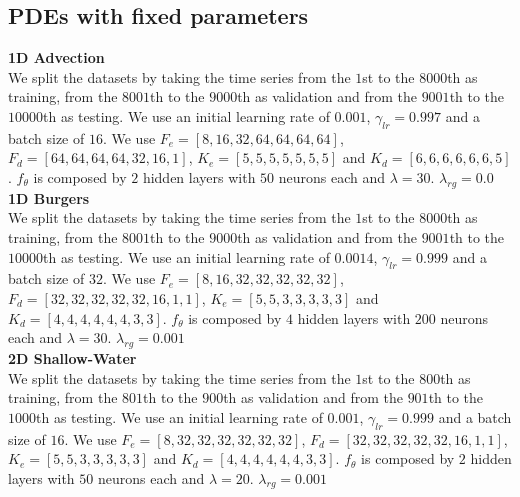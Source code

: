 \subsection{PDEs with fixed parameters}
\textbf{1D Advection}\\
We split the datasets  by taking the time series from the $1$st to the $8000$th as training, from the $8001$th to the $9000$th as validation and from the $9001$th to the $10000$th as testing. We use an initial learning rate of $0.001$, $\gamma_{lr} = 0.997$ and a batch size of $16$. We use $F_e =[8,16,32,64,64,64,64]$, $F_d =[64,64,64,64,32,16,1]$, $K_e = [5,5,5,5,5,5,5]$ and  $K_d = [6,6,6,6,6,6,5]$. $f_\theta$ is composed by $2$ hidden layers with $50$ neurons each and $\lambda=30$. $\lambda_{rg} = 0.0$\\
\textbf{1D Burgers}\\
We split the datasets  by taking the time series from the $1$st to the $8000$th as training, from the $8001$th to the $9000$th as validation and from the $9001$th to the $10000$th as testing. We use an initial learning rate of $0.0014$, $\gamma_{lr} = 0.999$ and a batch size of $32$. We use $F_e =[8, 16, 32, 32, 32, 32, 32]$, $F_d =[32, 32, 32, 32, 32, 16, 1,1]$, $K_e = [5,5,3,3,3,3,3]$ and  $K_d = [4,4,4,4,4,4,3,3]$. $f_\theta$ is composed by $4$ hidden layers with $200$ neurons each and $\lambda=30$. $\lambda_{rg} = 0.001$
\\
\textbf{2D Shallow-Water}\\
We split the datasets  by taking the time series from the $1$st to the $800$th as training, from the $801$th to the $900$th as validation and from the $901$th to the $1000$th as testing. We use an initial learning rate of $0.001$, $\gamma_{lr} = 0.999$ and a batch size of $16$. We use $F_e =[8, 32, 32, 32, 32, 32, 32]$, $F_d =[32, 32, 32, 32, 32, 16, 1,1]$, $K_e = [5,5,3,3,3,3,3]$ and  $K_d = [4,4,4,4,4,4,3,3]$. $f_\theta$ is composed by $2$ hidden layers with $50$ neurons each and $\lambda=20$. $\lambda_{rg} = 0.001$
